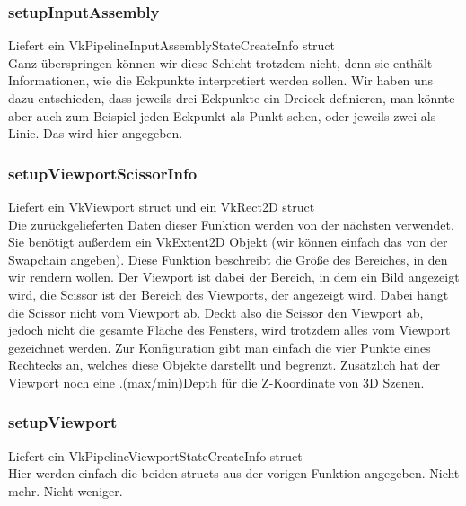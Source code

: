 \documentclass[11pt,a4paper]{report}
\begin{document}
\subsubsection{setupInputAssembly}
Liefert ein VkPipelineInputAssemblyStateCreateInfo struct\\
Ganz überspringen können wir diese Schicht trotzdem nicht, denn sie enthält Informationen, wie die Eckpunkte interpretiert werden sollen. Wir haben uns dazu entschieden, dass jeweils drei Eckpunkte ein Dreieck definieren, man könnte aber auch zum Beispiel jeden Eckpunkt als Punkt sehen, oder jeweils zwei als Linie. Das wird hier angegeben.

\subsubsection{setupViewportScissorInfo}
Liefert ein VkViewport struct und ein VkRect2D struct\\
Die zurückgelieferten Daten dieser Funktion werden von der nächsten verwendet. Sie benötigt außerdem ein VkExtent2D Objekt (wir können einfach das von der Swapchain angeben). Diese Funktion beschreibt die Größe des Bereiches, in den wir rendern wollen. Der Viewport ist dabei der Bereich, in dem ein Bild angezeigt wird, die Scissor ist der Bereich des Viewports, der angezeigt wird. Dabei hängt die Scissor nicht vom Viewport ab. Deckt also die Scissor den Viewport ab, jedoch nicht die gesamte Fläche des Fensters, wird trotzdem alles vom Viewport gezeichnet werden. Zur Konfiguration gibt man einfach die vier Punkte eines Rechtecks an, welches diese Objekte darstellt und begrenzt. Zusätzlich hat der Viewport noch eine .(max/min)Depth für die Z-Koordinate von 3D Szenen.

\subsubsection{setupViewport}
Liefert ein VkPipelineViewportStateCreateInfo struct\\
Hier werden einfach die beiden structs aus der vorigen Funktion angegeben. Nicht mehr. Nicht weniger.
\end{document}
